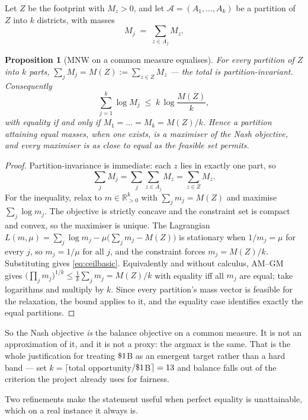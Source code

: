 \documentclass[11pt]{article}
\newtheorem{prop}{Proposition}
\theoremstyle{definition}
\begin{document}
Let $Z$ be the footprint with $M_z>0$, and let
$\mathcal A=(A_1,\dots,A_k)$ be a partition of $Z$ into $k$ districts, with masses
\[
M_j \;=\; \sum_{z\in A_j} M_z .
\]

\begin{prop}[MNW on a common measure equalises]\label{prop:equal}
For every partition of $Z$ into $k$ parts, $\sum_{j}M_j = M(Z):=\sum_{z\in Z}M_z$ --- the
total is \emph{partition-invariant}. Consequently
\begin{equation}\label{eq:ceilbasic}
\sum_{j=1}^{k}\log M_j \;\le\; k\,\log\!\frac{M(Z)}{k},
\end{equation}
with equality if and only if $M_1=\dots=M_k=M(Z)/k$. Hence a partition attaining equal
masses, when one exists, is a maximiser of the Nash objective, and every maximiser is as
close to equal as the feasible set permits.
\end{prop}

\begin{proof}
Partition-invariance is immediate: each $z$ lies in exactly one part, so
\[
\textstyle\sum_j M_j=\sum_j\sum_{z\in A_j}M_z=\sum_{z\in Z}M_z .
\]
For the inequality, relax
to $m\in\mathbb R^k_{>0}$ with $\sum_j m_j = M(Z)$ and maximise $\sum_j\log m_j$. The
objective is strictly concave and the constraint set is compact and convex, so the
maximiser is unique. The Lagrangian
$L(m,\mu)=\sum_j\log m_j-\mu\bigl(\sum_j m_j - M(Z)\bigr)$
is stationary when $1/m_j=\mu$ for every $j$, so $m_j=1/\mu$ for all $j$, and the
constraint forces $m_j=M(Z)/k$. Substituting gives \eqref{eq:ceilbasic}. Equivalently
and without calculus, AM--GM gives
$\bigl(\prod_j m_j\bigr)^{1/k}\le \frac1k\sum_j m_j = M(Z)/k$
with equality iff all $m_j$ are equal; take logarithms and multiply by $k$. Since every
partition's mass vector is feasible for the relaxation, the bound applies to it, and the
equality case identifies exactly the equal partitions.
\end{proof}

So the Nash objective \emph{is} the balance objective on a common measure. It is not an
approximation of it, and it is not a proxy: the argmax is the same. That is the whole
justification for treating $\$1$B as an emergent target rather than a hard band ---
set $k=\lceil$total opportunity$/\$1$B$\rceil=13$ and balance falls out
of the criterion the project already uses for fairness.

Two refinements make the statement useful when perfect equality is unattainable, which on
a real instance it always is.
\end{document}
